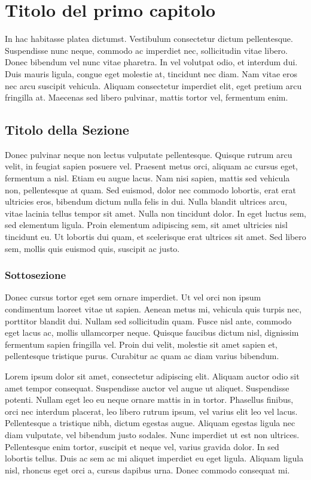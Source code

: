 \documentclass[target=bach,aauheader=,style=]{thud}
\begin{document}
\chapter{Titolo del primo capitolo}
In hac habitasse platea dictumst. Vestibulum consectetur dictum pellentesque. Suspendisse nunc neque, commodo ac imperdiet nec, sollicitudin vitae libero. Donec bibendum vel nunc vitae pharetra. In vel volutpat odio, et interdum dui. Duis mauris ligula, congue eget molestie at, tincidunt nec diam. Nam vitae eros nec arcu suscipit vehicula. Aliquam consectetur imperdiet elit, eget pretium arcu fringilla at. Maecenas \cite{Knu86} sed libero pulvinar, mattis tortor vel, fermentum enim.

\section{Titolo della Sezione}
Donec pulvinar neque non lectus vulputate pellentesque. Quisque rutrum arcu velit, in feugiat sapien posuere vel. Praesent metus orci, aliquam ac cursus eget, fermentum a nisl. Etiam eu augue lacus. Nam nisi sapien, mattis sed vehicula non, pellentesque at quam. Sed euismod, dolor nec commodo lobortis, erat erat ultricies eros, bibendum dictum nulla felis in dui. Nulla blandit ultrices arcu, vitae lacinia tellus tempor sit amet. Nulla non tincidunt dolor. In eget luctus sem, sed elementum ligula. Proin elementum adipiscing sem, sit amet ultricies nisl tincidunt eu. Ut lobortis dui quam, et scelerisque erat ultrices sit amet. Sed libero sem, mollis quis euismod quis, suscipit ac justo.

\subsection{Sottosezione}
Donec cursus tortor eget sem ornare imperdiet. Ut vel orci non ipsum condimentum laoreet vitae ut sapien. Aenean metus mi, vehicula quis turpis nec, porttitor blandit dui. Nullam sed sollicitudin quam. Fusce nisl ante, commodo eget lacus ac, mollis ullamcorper neque. Quisque faucibus dictum nisl, dignissim fermentum sapien fringilla vel. Proin dui velit, molestie sit amet sapien et, pellentesque tristique purus. Curabitur ac quam ac diam varius bibendum.

Lorem ipsum dolor sit amet, consectetur adipiscing elit. Aliquam auctor odio sit amet tempor consequat. Suspendisse auctor vel augue ut aliquet. Suspendisse potenti. Nullam eget leo eu neque ornare mattis in in tortor. Phasellus finibus, orci nec interdum placerat, leo libero rutrum ipsum, vel varius elit leo vel lacus. Pellentesque a tristique nibh, dictum egestas augue. Aliquam egestas ligula nec diam vulputate, vel bibendum justo sodales. Nunc imperdiet ut est non ultrices. Pellentesque enim tortor, suscipit et neque vel, varius gravida dolor. In sed lobortis tellus. Duis ac sem ac mi aliquet imperdiet eu eget ligula. Aliquam ligula nisl, rhoncus eget orci a, cursus dapibus urna. Donec commodo consequat mi.
\end{document}
